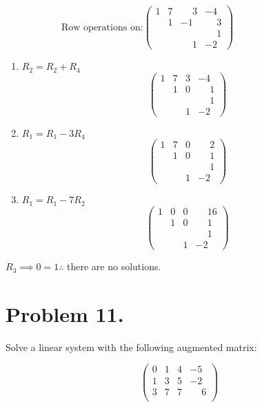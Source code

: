 \documentclass[11pt, notitlepage]{report}
\begin{document}
\[\text{Row operations on:}\left(\begin{matrix}{}
		  1& 7& \phantom{-}3&-4 \\
		  & 1&-1 &\phantom{-}3\\
		  & & \phantom{-}&\phantom{-}1 \\
		  & & \phantom{-}1&-2
		\end{matrix}\right)\phantom{-----!!-}\]


\begin{enumerate}
	\item $R_2 = R_2+R_4$
		\noindent \[\left(\begin{matrix}{}
		  1& 7& 3&-4 \\
		  & 1&0 &\phantom{-}1\\
		  & & &\phantom{-}1 \\
		  & & 1&-2
		\end{matrix}\right)\]
		

	\item $R_1 = R_1-3R_4$
		\noindent \[\left(\begin{matrix}{}
		  1& 7& 0&\phantom{-}2 \\
		  & 1&0 &\phantom{-}1\\
		  & & &\phantom{-}1 \\
		  & & 1&-2
		\end{matrix}\right)\]

	\item $R_1 = R_1-7R_2$
		\noindent \[\left(\begin{matrix}{}
		  1& 0& 0&\phantom{-}16 \\
		  & 1&0 &\phantom{-}1\\
		  & & &\phantom{-}1 \\
		  & & 1&-2
		\end{matrix}\right)\]

\end{enumerate}

$R_3 \implies 0=1 \therefore$ there are no solutions.

\newpage
\section{Problem 11.}

Solve a linear system with the following augmented matrix:

\[\left(\begin{matrix}{}
  0& 1& 4&-5  \\
  1& 3& 5&-2  \\
  3& 7& 7&\phantom{-}6  \\
\end{matrix}\right)\]
\end{document}
